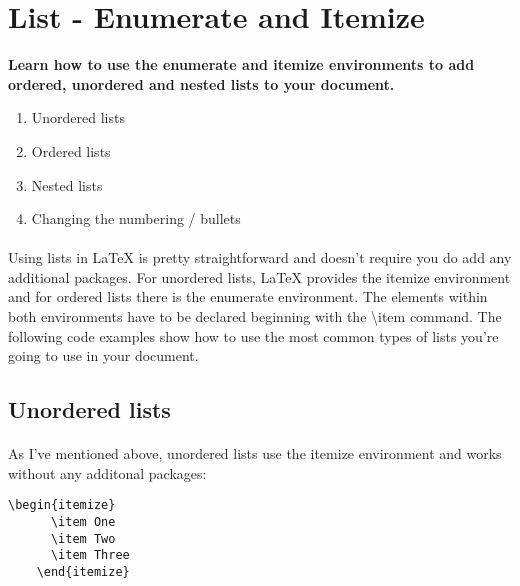 
\maketitle
\newpage
\section{List - Enumerate and Itemize}
  \textbf{
    Learn how to use the enumerate and itemize environments to add ordered, unordered and nested lists to your document.
  }
  \begin{enumerate} %
    \item Unordered lists
    \item Ordered lists
    \item Nested lists
    \item Changing the numbering / bullets
  \end{enumerate} 
  \paragraph{}
  Using lists in LaTeX is pretty straightforward and doesn't require you do add any additional packages. For unordered lists, LaTeX provides the itemize environment and for ordered lists there is the enumerate environment. The elements within both environments have to be declared beginning with the \textbackslash item command. The following code examples show how to use the most common types of lists you're going to use in your document.
  
  \subsection{Unordered lists}
  \paragraph{}
  As I've mentioned above, unordered lists use the itemize environment and works without any additonal packages:

  \begin{lstlisting}[language={[LaTeX]TeX},breaklines=true,frame=single]
    \begin{itemize}
      \item One
      \item Two
      \item Three
    \end{itemize}
  \end{lstlisting}

